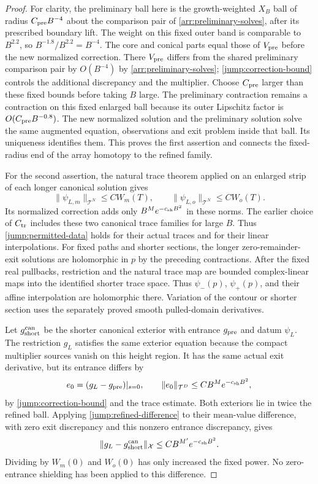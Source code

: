 \begin{proof}
For clarity, the preliminary ball here is the growth-weighted
$X_B$ ball of radius $C_{\rm pre}B^{-4}$ about the comparison pair
of \cref{arr:preliminary-solves}, after its prescribed boundary
lift.  The weight on this fixed outer band is comparable to
$B^{2.2}$, so $B^{-1.8}/B^{2.2}=B^{-4}$.  The core and conical
parts equal those of $V_{\rm pre}$ before the new normalized
correction.  There $V_{\rm pre}$ differs from the shared preliminary
comparison pair by $O(B^{-4})$ by \cref{arr:preliminary-solves};
\eqref{jump:correction-bound} controls the additional discrepancy
and the multiplier.  Choose $C_{\rm pre}$ larger than these fixed
bounds before taking $B$ large.  The preliminary contraction
remains a contraction on this fixed enlarged ball because its
outer Lipschitz factor is $O(C_{\rm pre}B^{-0.8})$.  The new
normalized solution and the preliminary solution solve the same
augmented equation, observations and exit problem inside that
ball.  Its uniqueness identifies them.  This proves the first
assertion and connects the fixed-radius end of the array
homotopy to the refined family.

For the second assertion, the natural trace theorem applied on an
enlarged strip of each longer canonical solution gives
\[
 \|\psi_{L,m}\|_{\mathcal T^N}\leq C W_m(T),\qquad
 \|\psi_{L,o}\|_{\mathcal T^N}\leq C W_o(T).
\]
Its normalized correction adds only
$B^M e^{-c_{\rm sh}B^2}$ in these norms.  The earlier choice
of $C_{\rm tr}$ includes these two canonical trace families
for large $B$.  Thus
\eqref{jump:permitted-data} holds for their actual traces and
for their linear interpolations.
For fixed paths and shorter sections, the longer zero-remainder-exit
solutions are holomorphic in $p$ by the preceding contractions.
After the fixed real pullbacks, restriction and the natural trace map
are bounded complex-linear maps into the identified shorter trace
space.  Thus $\psi_-(p)$, $\psi_+(p)$, and their affine interpolation
are holomorphic there.  Variation of the contour or shorter section
uses the separately proved smooth pulled-domain derivatives.

Let $g_{\rm short}^{\rm can}$ be the shorter canonical exterior
with entrance $g_{\rm pre}$ and datum $\psi_L$.  The restriction
$g_L$ satisfies the same exterior equation because the compact
multiplier sources vanish on this height region.  It has the same
actual exit derivative, but its entrance differs
by
\[
 e_0=(g_L-g_{\rm pre})|_{s=0},\qquad
 \|e_0\|_{\mathcal T^D}\leq CB^M e^{-c_{\rm sh}B^2},
\]
by \eqref{jump:correction-bound} and the trace estimate.  Both
exteriors lie in twice the refined ball.  Applying
\eqref{jump:refined-difference} to their mean-value difference,
with zero exit discrepancy and this nonzero entrance discrepancy,
gives
\begin{equation}\label{jump:restriction-difference}
 \|g_L-g_{\rm short}^{\rm can}\|_{\mathcal X}
             \leq CB^{M'}e^{-c_{\rm sh}B^2}.
\end{equation}
Dividing by $W_m(0)$ and $W_o(0)$ has only increased the fixed
power.  No zero-entrance shielding has been applied to this
difference.


\end{proof}
